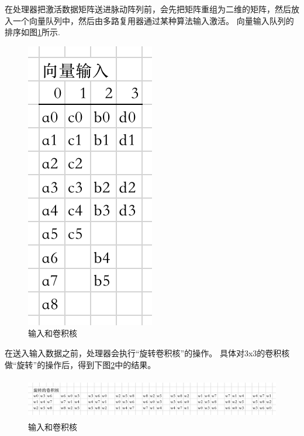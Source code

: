 在处理器把激活数据矩阵送进脉动阵列前，会先把矩阵重组为二维的矩阵，然后放入一个向量队列中，然后由多路复用器通过某种算法输入激活。
向量输入队列的排序如图\ref{fig:vector_inputs}所示.
\begin{figure}[htbp]
    \centering
    \includegraphics[]{figures/vector_inputs.png}
    \caption{输入和卷积核}
    \label{fig:vector_inputs}
\end{figure} 

在送入输入数据之前，处理器会执行“旋转卷积核”\cite{2017Rotating}的操作。
具体对3x3的卷积核做“旋转”的操作后，得到下图\ref{fig:rotated_kernel}中的结果。
\begin{figure}[htbp]
    \centering
    \includegraphics[width=12cm,height=1.8cm]{figures/rotated_kernel.png}
    \caption{输入和卷积核}
    \label{fig:rotated_kernel}
\end{figure} 

